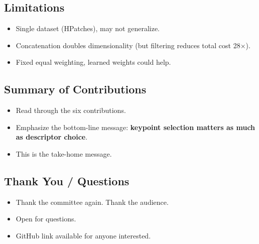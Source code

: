 \documentclass[11pt, letterpaper]{article}
\begin{document}
\subsection{Limitations}
\begin{itemize}
  \item Single dataset (HPatches), may not generalize.
  \item Concatenation doubles dimensionality (but filtering reduces total cost 28$\times$).
  \item Fixed equal weighting, learned weights could help.
\end{itemize}

\subsection{Summary of Contributions}
\begin{itemize}
  \item Read through the six contributions.
  \item Emphasize the bottom-line message: \textbf{keypoint selection matters as much as descriptor choice}.
  \item This is the take-home message.
\end{itemize}

\subsection{Thank You / Questions}
\begin{itemize}
  \item Thank the committee again. Thank the audience.
  \item Open for questions.
  \item GitHub link available for anyone interested.
\end{itemize}
\end{document}
